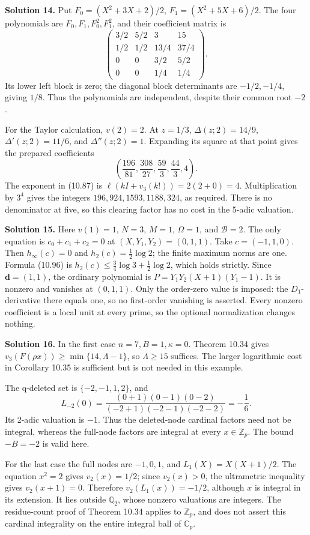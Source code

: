 \documentclass[
  11pt,
  a4paper,
]{article}
\begin{document}
\textbf{Solution 14.} Put \(F_0=(X^2+3X+2)/2\), \(F_1=(X^2+5X+6)/2\).
The four polynomials are \(F_0,F_1,F_0^2,F_1^2\), and their coefficient
matrix is \[
\begin{pmatrix}3/2&5/2&3&15\\1/2&1/2&13/4&37/4\\0&0&3/2&5/2\\0&0&1/4&1/4\end{pmatrix}.
\] Its lower left block is zero; the diagonal block determinants are
\(-1/2,-1/4\), giving \(1/8\). Thus the polynomials are independent,
despite their common root \(-2\).

For the Taylor calculation, \(v(2)=2\). At \(z=1/3\),
\(\Delta(z;2)=14/9\), \(\Delta'(z;2)=11/6\), and \(\Delta''(z;2)=1\).
Expanding its square at that point gives the prepared coefficients \[
\left(\frac{196}{81},\frac{308}{27},\frac{59}{3},\frac{44}{3},4\right).
\] The exponent in (10.87) is \(\ell(kI+v_3(k!))=2(2+0)=4\).
Multiplication by \(3^4\) gives the integers \(196,924,1593,1188,324\),
as required. There is no denominator at five, so this clearing factor
has no cost in the 5-adic valuation.

\textbf{Solution 15.} Here \(v(1)=1\), \(N=3\), \(M=1\), \(\Omega=1\),
and \(\mathcal B=2\). The only equation is \(c_0+c_1+c_2=0\) at
\((X,Y_1,Y_2)=(0,1,1)\). Take \(c=(-1,1,0)\). Then \(h_\infty(c)=0\) and
\(h_2(c)=\frac12\log2\); the finite maximum norms are one. Formula
(10.96) is \(h_2(c)\le\frac34\log3+\frac12\log2\), which holds strictly.
Since \(\boldsymbol d=(1,1)\), the ordinary polynomial is
\(P=Y_1Y_2(X+1)(Y_1-1)\). It is nonzero and vanishes at \((0,1,1)\).
Only the order-zero value is imposed: the \(D_1\)-derivative there
equals one, so no first-order vanishing is asserted. Every nonzero
coefficient is a local unit at every prime, so the optional
normalization changes nothing.

\textbf{Solution 16.} In the first case \(n=7,B=1,\kappa=0\). Theorem
10.34 gives \(v_3(F(\rho x))\ge\min\{14,\Lambda-1\}\), so
\(\Lambda\ge15\) suffices. The larger logarithmic cost in Corollary
10.35 is sufficient but is not needed in this example.

The q-deleted set is \(\{-2,-1,1,2\}\), and \[
L_{-2}(0)=\frac{(0+1)(0-1)(0-2)}{(-2+1)(-2-1)(-2-2)}=-\frac16.
\] Its 2-adic valuation is \(-1\). Thus the deleted-node cardinal
factors need not be integral, whereas the full-node factors are integral
at every \(x\in\mathbb Z_p\). The bound \(-B=-2\) is valid here.

For the last case the full nodes are \(-1,0,1\), and
\(L_1(X)=X(X+1)/2\). The equation \(x^2=2\) gives \(v_2(x)=1/2\); since
\(v_2(x)>0\), the ultrametric inequality gives \(v_2(x+1)=0\). Therefore
\(v_2(L_1(x))=-1/2\), although \(x\) is integral in its extension. It
lies outside \(\mathbb Q_2\), whose nonzero valuations are integers. The
residue-count proof of Theorem 10.34 applies to \(\mathbb Z_p\), and
does not assert this cardinal integrality on the entire integral ball of
\(\mathbb C_p\).
\end{document}
